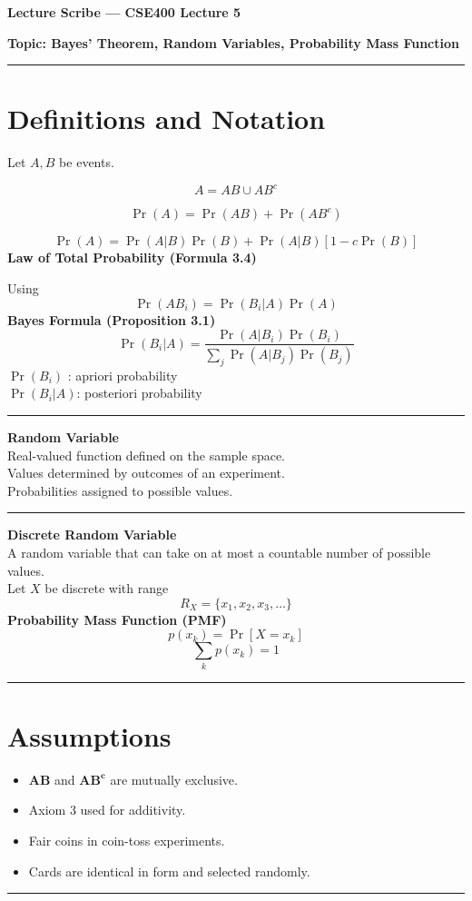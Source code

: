 \documentclass[12pt]{article}
\begin{document}
\begin{center}
\textbf{Lecture Scribe — CSE400 Lecture 5}
\end{center}

\textbf{Topic: Bayes’ Theorem, Random Variables, Probability Mass Function}\\
\noindent\rule{\textwidth}{0.6pt}
\section*{Definitions and Notation}

Let $A, B$ be events.

\[
A = AB \cup AB^c
\]

\[
\Pr(A) = \Pr(AB) + \Pr(AB^c)
\]

\[
\Pr(A) = \Pr(A|B)\Pr(B) + \Pr(A|B)[1 - c\Pr(B)]
\]
\textbf{Law of Total Probability (Formula 3.4)}

Using
\[
\Pr(AB_i) = \Pr(B_i|A)\Pr(A)
\]
\textbf{Bayes Formula (Proposition 3.1)}
\[
\Pr(B_i|A) =
\frac{\Pr(A|B_i)\Pr(B_i)}{\sum_j \Pr(A|B_j)\Pr(B_j)}
\]
$\Pr(B_i)$ : apriori probability\\
$\Pr(B_i|A)$: posteriori probability\\
\noindent\rule{\textwidth}{0.6pt}
\textbf{Random Variable} \\
Real-valued function defined on the sample space. \\
Values determined by outcomes of an experiment. \\
Probabilities assigned to possible values. \\
\noindent\rule{\textwidth}{0.6pt}
\textbf{Discrete Random Variable} \\
A random variable that can take on at most a countable number of possible values.\\
Let $X$ be discrete with range
\[
R_X = \{x_1, x_2, x_3, \ldots \}
\]
\textbf{Probability Mass Function (PMF)}
\[
p(x_k) = \Pr[X = x_k]
\]
\[
\sum_{k} p(x_k) = 1
\]
\noindent\rule{\textwidth}{0.6pt}
\section*{Assumptions}
\begin{itemize}
\item $\mathbf{AB}$ and $\mathbf{AB^c}$ are mutually exclusive.\\
\item Axiom 3 used for additivity. \\
\item Fair coins in coin-toss experiments. \\
\item Cards are identical in form and selected randomly.
\end{itemize}
\noindent\rule{\textwidth}{0.6pt}
\end{document}
